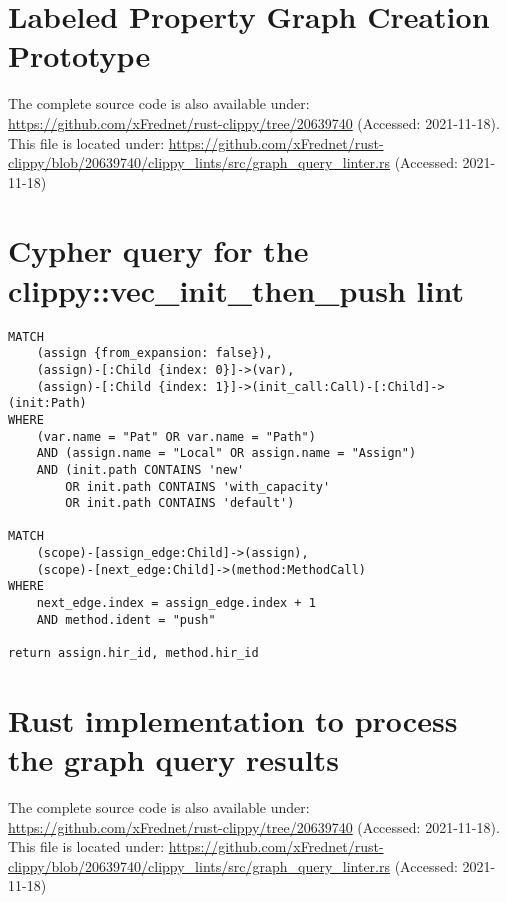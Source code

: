 \appendix

\section{Labeled Property Graph Creation Prototype} \label{app:lpg-creation-code}

\scriptsize


\normalsize
The complete source code is also available under: \url{https://github.com/xFrednet/rust-clippy/tree/20639740} (Accessed: 2021-11-18). This file is located under: \url{https://github.com/xFrednet/rust-clippy/blob/20639740/clippy_lints/src/graph_query_linter.rs} (Accessed: 2021-11-18)

\section[Cypher query: clippy::vec\_init\_then\_push]{Cypher query for the clippy::vec\_init\_then\_push lint} \label{app:query.vec-init-then-push}

\small
\begin{verbatim}
MATCH
    (assign {from_expansion: false}),
    (assign)-[:Child {index: 0}]->(var),
    (assign)-[:Child {index: 1}]->(init_call:Call)-[:Child]->(init:Path) 
WHERE
    (var.name = "Pat" OR var.name = "Path")
    AND (assign.name = "Local" OR assign.name = "Assign")
    AND (init.path CONTAINS 'new' 
        OR init.path CONTAINS 'with_capacity'
        OR init.path CONTAINS 'default')

MATCH
    (scope)-[assign_edge:Child]->(assign),
    (scope)-[next_edge:Child]->(method:MethodCall)
WHERE
    next_edge.index = assign_edge.index + 1
    AND method.ident = "push"

return assign.hir_id, method.hir_id
\end{verbatim}

\section{Rust implementation to process the graph query results} \label{app:rust.new-vec-init-the-push-impl}

\scriptsize


\normalsize
The complete source code is also available under: \url{https://github.com/xFrednet/rust-clippy/tree/20639740} (Accessed: 2021-11-18). This file is located under: \url{https://github.com/xFrednet/rust-clippy/blob/20639740/clippy_lints/src/graph_query_linter.rs} (Accessed: 2021-11-18)